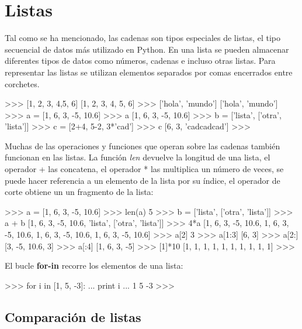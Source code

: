 \section{Listas}

Tal como se ha mencionado, las cadenas son tipos especiales de listas, el tipo secuencial de datos más utilizado en Python. En una lista se pueden almacenar diferentes tipos de datos como números, cadenas e incluso otras listas. Para representar las listas se utilizan elementos separados por comas encerrados entre corchetes.\\

\begin{pyglist} [language=python]
>>> [1, 2, 3, 4,5, 6]
[1, 2, 3, 4, 5, 6]
>>> ['hola', 'mundo']
['hola', 'mundo']
>>> a = [1, 6, 3, -5, 10.6]
>>> a
[1, 6, 3, -5, 10.6]
>>> b = ['lista', ['otra', 'lista']]
>>> c = [2+4, 5-2, 3*'cad']
>>> c
[6, 3, 'cadcadcad']
>>> 
\end{pyglist}

Muchas de las operaciones y funciones que operan sobre las cadenas también funcionan en las listas. La función \textit{len} devuelve la longitud de una lista, el operador + las concatena, el operador * las multiplica un número de veces, se puede hacer referencia a un elemento de la lista por su índice, el operador de corte obtiene un un fragmento de la lista:\\

\begin{pyglist} [language=python]
>>> a = [1, 6, 3, -5, 10.6]
>>> len(a)
5
>>> b = ['lista', ['otra', 'lista']]
>>> a + b
[1, 6, 3, -5, 10.6, 'lista', ['otra', 'lista']]
>>> 4*a
[1, 6, 3, -5, 10.6, 1, 6, 3, -5, 10.6, 1, 6, 3, -5, 10.6, 1, 6, 3, -5, 10.6]
>>> a[2]
3
>>> a[1:3]
[6, 3]
>>> a[2:]
[3, -5, 10.6, 3]
>>> a[:4]
[1, 6, 3, -5]
>>> [1]*10
[1, 1, 1, 1, 1, 1, 1, 1, 1, 1]
>>> 

\end{pyglist}

El bucle \textbf{for-in} recorre los elementos de una lista:\\

\begin{pyglist} [language=python]
>>> for i in [1, 5, -3]:
...     print i
... 
1
5
-3
>>> 
\end{pyglist}

\subsection{Comparación de listas}


